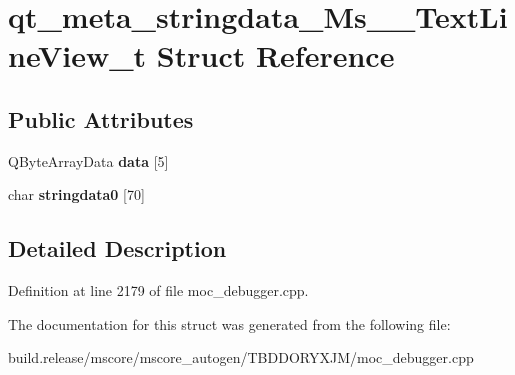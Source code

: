 \hypertarget{structqt__meta__stringdata___ms_____text_line_view__t}{}\section{qt\+\_\+meta\+\_\+stringdata\+\_\+\+Ms\+\_\+\+\_\+\+Text\+Line\+View\+\_\+t Struct Reference}
\label{structqt__meta__stringdata___ms_____text_line_view__t}
\subsection*{Public Attributes}
\begin{DoxyCompactItemize}
\item 
\mbox{\label{structqt__meta__stringdata___ms_____text_line_view__t_aad77e8fd8962caae083f2e1d89fadcf5}} 
Q\+Byte\+Array\+Data {\bfseries data} \mbox{[}5\mbox{]}
\item 
\mbox{\label{structqt__meta__stringdata___ms_____text_line_view__t_a54307d5646f916f63f7c742a54927a03}} 
char {\bfseries stringdata0} \mbox{[}70\mbox{]}
\end{DoxyCompactItemize}


\subsection{Detailed Description}


Definition at line 2179 of file moc\+\_\+debugger.\+cpp.



The documentation for this struct was generated from the following file\+:\begin{DoxyCompactItemize}
\item 
build.\+release/mscore/mscore\+\_\+autogen/\+T\+B\+D\+D\+O\+R\+Y\+X\+J\+M/moc\+\_\+debugger.\+cpp\end{DoxyCompactItemize}
